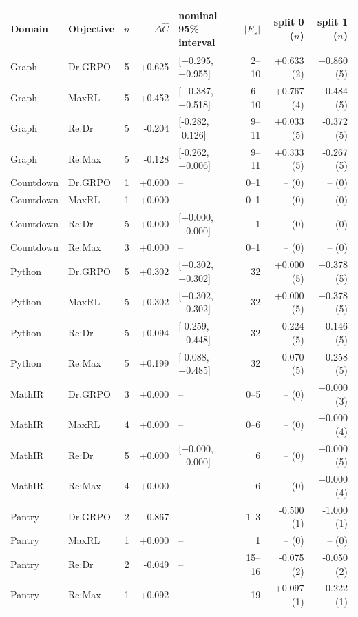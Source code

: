 \begin{table}[!htbp]
\centering
\scriptsize
\setlength{\tabcolsep}{3pt}
\begin{tabular}{@{}llcrlrrr@{}}
\toprule
Domain & Objective & $n$ & $\Delta\widehat C$ & nominal 95\% interval & $|E_s|$ & split 0 ($n$) & split 1 ($n$) \\
\midrule
Graph & Dr.GRPO & 5 & +0.625 & [+0.295, +0.955] & 2--10 & +0.633 (2) & +0.860 (5) \\
Graph & MaxRL & 5 & +0.452 & [+0.387, +0.518] & 6--10 & +0.767 (4) & +0.484 (5) \\
Graph & Re:Dr & 5 & -0.204 & [-0.282, -0.126] & 9--11 & +0.033 (5) & -0.372 (5) \\
Graph & Re:Max & 5 & -0.128 & [-0.262, +0.006] & 9--11 & +0.333 (5) & -0.267 (5) \\
Countdown & Dr.GRPO & 1 & +0.000 & -- & 0--1 & -- (0) & -- (0) \\
Countdown & MaxRL & 1 & +0.000 & -- & 0--1 & -- (0) & -- (0) \\
Countdown & Re:Dr & 5 & +0.000 & [+0.000, +0.000] & 1 & -- (0) & -- (0) \\
Countdown & Re:Max & 3 & +0.000 & -- & 0--1 & -- (0) & -- (0) \\
Python & Dr.GRPO & 5 & +0.302 & [+0.302, +0.302] & 32 & +0.000 (5) & +0.378 (5) \\
Python & MaxRL & 5 & +0.302 & [+0.302, +0.302] & 32 & +0.000 (5) & +0.378 (5) \\
Python & Re:Dr & 5 & +0.094 & [-0.259, +0.448] & 32 & -0.224 (5) & +0.146 (5) \\
Python & Re:Max & 5 & +0.199 & [-0.088, +0.485] & 32 & -0.070 (5) & +0.258 (5) \\
MathIR & Dr.GRPO & 3 & +0.000 & -- & 0--5 & -- (0) & +0.000 (3) \\
MathIR & MaxRL & 4 & +0.000 & -- & 0--6 & -- (0) & +0.000 (4) \\
MathIR & Re:Dr & 5 & +0.000 & [+0.000, +0.000] & 6 & -- (0) & +0.000 (5) \\
MathIR & Re:Max & 4 & +0.000 & -- & 6 & -- (0) & +0.000 (4) \\
Pantry & Dr.GRPO & 2 & -0.867 & -- & 1--3 & -0.500 (1) & -1.000 (1) \\
Pantry & MaxRL & 1 & +0.000 & -- & 1 & -- (0) & -- (0) \\
Pantry & Re:Dr & 2 & -0.049 & -- & 15--16 & -0.075 (2) & -0.050 (2) \\
Pantry & Re:Max & 1 & +0.092 & -- & 19 & +0.097 (1) & -0.222 (1) \\

\end{tabular}
\end{table}
